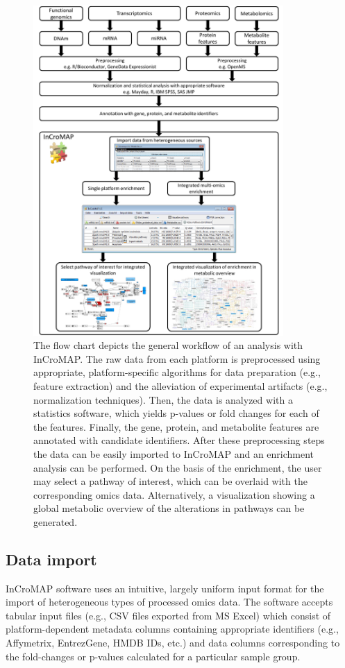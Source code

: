 \documentclass[final,5p,times,twocolumn]{elsarticle}
\begin{document}
\begin{figure}
\center
\includegraphics[width=0.85\textwidth]{InCroMAP_workflow.pdf}
\caption{The flow chart depicts the general workflow of an analysis with InCroMAP. The raw data from each platform is preprocessed using appropriate, platform-specific algorithms for data preparation (e.g., feature extraction) and the alleviation of experimental artifacts (e.g., normalization techniques). Then, the data is analyzed with a statistics software, which yields p-values or fold changes for each of the features. Finally, the gene, protein, and metabolite features are annotated with candidate identifiers. After these preprocessing steps the data can be easily imported to InCroMAP and an enrichment analysis can be performed. On the basis of the enrichment, the user may select a pathway of interest, which can be overlaid with the corresponding omics data. Alternatively, a visualization showing a global metabolic overview of the alterations in pathways can be generated.}
\label{fig:incromap-workflow}
\end{figure}

\subsection{Data import}
InCroMAP software uses an intuitive, largely uniform input format for the import of heterogeneous types of processed omics data. The software accepts tabular input files (e.g., CSV files exported from MS Excel) which consist of platform-dependent metadata columns containing appropriate identifiers (e.g., Affymetrix, EntrezGene, HMDB IDs, etc.) and data columns corresponding to the fold-changes or p-values calculated for a particular sample group.
\end{document}
